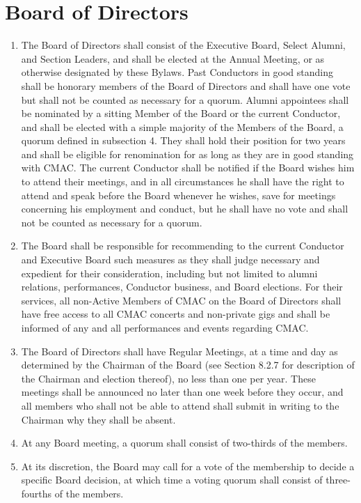 \documentclass{article}
\begin{document}
\section{Board of Directors}
\begin{enumerate}
\item The Board of Directors shall consist of the Executive Board, Select
Alumni, and Section Leaders, and shall be elected at the Annual Meeting,
or as otherwise designated by these Bylaws. Past Conductors in good
standing shall be honorary members of the Board of Directors and shall
have one vote but shall not be counted as necessary for a quorum.
Alumni appointees shall be nominated by a sitting Member of the Board
or the current Conductor, and shall be elected with a simple majority
of the Members of the Board, a quorum defined in subsection 4. They
shall hold their position for two years and shall be eligible for
renomination for as long as they are in good standing with CMAC. The
current Conductor shall be notified if the Board wishes him to attend
their meetings, and in all circumstances he shall have the right to
attend and speak before the Board whenever he wishes, save for meetings
concerning his employment and conduct, but he shall have no vote and
shall not be counted as necessary for a quorum.
\item The Board shall be responsible for recommending to the current Conductor
and Executive Board such measures as they shall judge necessary and
expedient for their consideration, including but not limited to alumni
relations, performances, Conductor business, and Board elections.
For their services, all non-Active Members of CMAC on the Board of
Directors shall have free access to all CMAC concerts and non-private
gigs and shall be informed of any and all performances and events
regarding CMAC.
\item The Board of Directors shall have Regular Meetings, at a time and
day as determined by the Chairman of the Board (see Section 8.2.7
for description of the Chairman and election thereof), no less than
one per year. These meetings shall be announced no later than one
week before they occur, and all members who shall not be able to attend
shall submit in writing to the Chairman why they shall be absent.
\item At any Board meeting, a quorum shall consist of two-thirds of the
members.
\item At its discretion, the Board may call for a vote of the membership
to decide a specific Board decision, at which time a voting quorum
shall consist of three-fourths of the members.
\end{enumerate}
\end{document}
